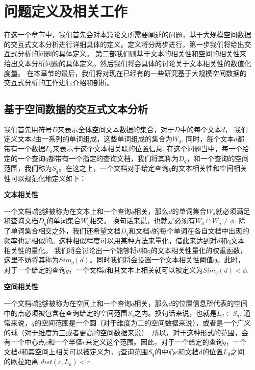 \chapter{问题定义及相关工作}
\label{problemdefinition}

在这一个章节中，我们首先会对本篇论文所需要阐述的问题，基于大规模空间数据的交互式文本分析进行详细具体的定义。定义将分两步进行，第一步我们将给出交互式分析的问题的具体定义。 第二部我们则基于文本的相关性和空间的相关性来给出文本分析问题的具体定义。然后我们将会具体的讨论关于文本相关性的数值化度量。 在本章节的最后，我们将对现在已经有的一些研究基于大规模空间数据的交互式分析的工作进行介绍和剖析。

\section{基于空间数据的交互式文本分析}
\label{sec:other}

我们首先用符号$D$来表示全体空间文本数据的集合，对于$D$中的每个文本$d$， 我们定义文本$d$由一系列的单词组成，这些单词组成的集合为$W_d$.  同时，每个文本$d$都带有一个数据$L_d$来表示于这个文本相关联的位置信息. 在这个问题当中，每一个给定的一个查询$q$都带有一个指定的查询文档，我们将其称为$D_q$，和一个查询的空间范围，我们称为$S_q$。在这之上，一个文档对于给定查询$q$的文本相关性和空间相关性可以规范化地定义如下：

\begin{definition}
	{\bf 文本相关性}
	
	一个文档$d$能够被称为在文本上和一个查询$q$相关，那么$d$的单词集合$W_d$就必须满足和查询文档$D_q$的单词集合$W_q$相交。 换句话来说，也就是必须有$W_d \cap W_q \ne \phi$. 除了单词集合相交之外，我们还希望文档$D_q$和文档$d$的每个单词在各自文档中出现的频率也是相似的。这种相似程度可以用某种方法来量化，借此来达到对$d$和q文本相关性的量化。 我们将会讨论出一个能够将$d$和q的文本相关性量化的权重函数，这里不妨将其称为$Sim_q(d)$。同时我们将会设置一个文本相关性阈值φ。此时，对于一个给定的查询$q$，一个文档$d$和其文本上相关就可以被定义为$Sim_q(d) < \phi$.
	
\end{definition}

\begin{definition}
	{\bf 空间相关性}
	
	一个文档$d$能够被称为在空间上和一个查询$q$相关，那么$d$的位置信息所代表的空间中的点必须被包含在查询给定的空间范围$S_q$之内。换句话来说，也就是$L_d \in S_q$. 通常来说，$q$的空间范围是一个圆（对于维度为二的空间数据来说），或者是一个广义的球（对于维度为三或者更高的空间数据来说）. 所以，对于这种形式的范围，会有一个中心点$c$和一个半径$r$来定义这个范围。因此，对于一个给定的查询$q$，一个文档$d$和其空间上相关可以被定义为，$q$查询范围$S_q$的中心$c$和文档$d$的位置$L_d$之间的欧拉距离 $dist(c, L_d) < r$.
	
\end{definition}

